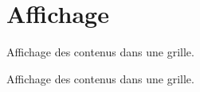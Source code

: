 \hypertarget{group__grille__affichage}{}\section{Affichage}
\label{group__grille__affichage}


Affichage des contenus dans une grille.  


Affichage des contenus dans une grille. 

